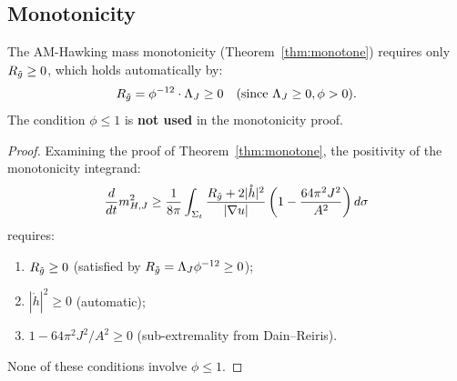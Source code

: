 \subsection{Monotonicity}

\begin{proposition}\label{prop:mono-independence}
The AM-Hawking mass monotonicity (Theorem~\ref{thm:monotone}) requires only $R_{\tilde{g}} \geq 0$, which holds automatically by:
\[
R_{\tilde{g}} = \phi^{-12} \cdot \Lambda_J \geq 0 \quad (\text{since } \Lambda_J \geq 0, \phi > 0).
\]
The condition $\phi \leq 1$ is \textbf{not used} in the monotonicity proof.
\end{proposition}

\begin{proof}
Examining the proof of Theorem~\ref{thm:monotone}, the positivity of the monotonicity integrand:
\[
\frac{d}{dt}m_{H,J}^2 \geq \frac{1}{8\pi} \int_{\Sigma_t} \frac{R_{\tilde{g}} + 2|\mathring{h}|^2}{|\nabla u|} \left(1 - \frac{64\pi^2 J^2}{A^2}\right) d\sigma
\]
requires:
\begin{enumerate}
    \item $R_{\tilde{g}} \geq 0$ (satisfied by $R_{\tilde{g}} = \Lambda_J \phi^{-12} \geq 0$);
    \item $|\mathring{h}|^2 \geq 0$ (automatic);
    \item $1 - 64\pi^2 J^2/A^2 \geq 0$ (sub-extremality from Dain--Reiris).
\end{enumerate}
None of these conditions involve $\phi \leq 1$.
\end{proof}

